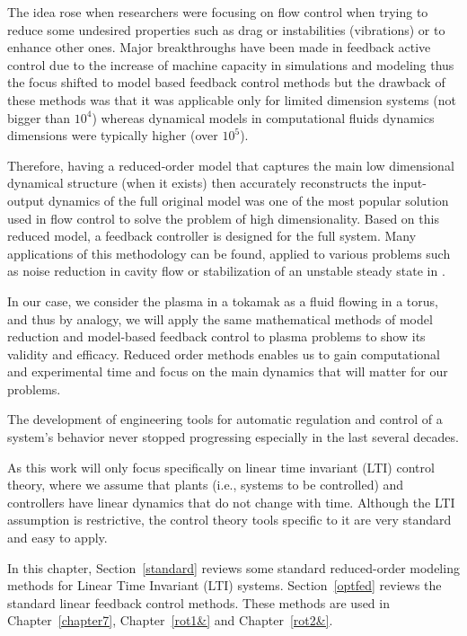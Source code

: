 \documentclass[12pt,lot, lof]{puthesis}
\begin{document}
The idea rose when researchers were focusing on flow control when trying to reduce some undesired properties such as drag or instabilities (vibrations) or to enhance other ones. Major breakthroughs have been made in feedback active control due to the increase of machine capacity in simulations and modeling \cite{ Kim07, Cattafesta08, Choi07, Sipp10} thus the focus shifted to model based feedback control methods but the drawback of these methods was that it was applicable only for limited dimension systems (not bigger than $10^4$) whereas dynamical models in computational fluids dynamics dimensions were typically higher (over $10^5$). 

Therefore, having a reduced-order model that captures the main low dimensional dynamical structure (when it exists) then accurately reconstructs the input-output dynamics of the full original model was one of the most popular solution used in flow control to solve the problem of high dimensionality. Based on this reduced model, a feedback controller is designed for the full system. Many applications of this methodology can be found, applied to various problems such as noise reduction in cavity flow \cite{Rowley05} or stabilization of an unstable steady state in \cite{Ahuja10}.

In our case, we consider the plasma in a tokamak as a fluid flowing in a torus, and thus by analogy, we will apply the same mathematical methods of model reduction and model-based feedback control to plasma problems to show its validity and efficacy. 
Reduced order methods enables us to gain computational and experimental time and focus on the main dynamics that will matter for our problems. 

The development of engineering tools for automatic regulation and control of a system's behavior never stopped progressing especially in the last several decades.

As this work will only focus specifically on linear time invariant (LTI) control theory, where we assume that plants (i.e., systems to be controlled) and controllers have linear dynamics that do not change with time. Although the LTI assumption is restrictive, the control theory tools specific to it are very standard and easy to apply. 

In this chapter, Section~\ref{standard} reviews some standard reduced-order modeling methods for Linear Time Invariant (LTI) systems. Section~\ref{optfed} reviews the standard linear feedback control methods.
These methods are used in Chapter~\ref{chapter7}, Chapter~\ref{rot1&} and Chapter~\ref{rot2&}. 
\end{document}
